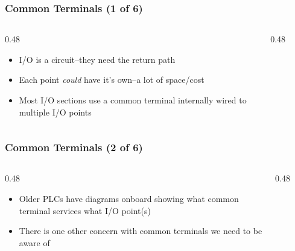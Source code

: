 \begin{frame}
    \frametitle{Common Terminals (1 of 6)}

    \begin{columns}
        \begin{column}{0.48\linewidth}
            \begin{itemize}
                \item I/O is a circuit--they need the return path
                \item Each point \emph{could} have it's own--a lot of space/cost
                \item Most I/O sections use a common terminal internally wired to multiple I/O points
            \end{itemize}
        \end{column}
        \begin{column}{0.48\linewidth}
            \begin{figure}
                \centering
                \resizebox{0.875\columnwidth}{!}{
                    
                }
            \end{figure}
        \end{column}
    \end{columns}
\end{frame}

\begin{frame}
    \frametitle{Common Terminals (2 of 6)}

    \begin{columns}
        \begin{column}{0.48\linewidth}
            \begin{itemize}
                \item Older PLCs have diagrams onboard showing what common terminal services what I/O point(s)
                \item There is one other concern with common terminals we need to be aware of
            \end{itemize}
        \end{column}
        \begin{column}{0.48\linewidth}
            \begin{figure}
                \centering
                \resizebox{0.875\columnwidth}{!}{
                    
                }
            \end{figure}
        \end{column}
    \end{columns}
\end{frame}

